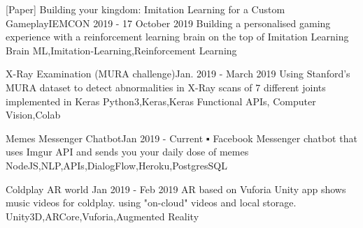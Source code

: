 

\begin{projects}
	
		\project
	{[Paper] Building your kingdom: Imitation Learning for a Custom Gameplay}{IEMCON 2019 - 17 October 2019}
	{\paperSymbol{ }
	}
	{Building a personalised gaming experience with a reinforcement learning brain on the top of Imitation Learning Brain}
	{ML,Imitation-Learning,Reinforcement Learning}

		\project
	{X-Ray Examination (MURA challenge)}{Jan. 2019 - March 2019}
	{}
	{Using Stanford's MURA dataset to detect abnormalities in X-Ray scans of 7 different joints
implemented in Keras}
	{Python3,Keras,Keras Functional APIs, Computer Vision,Colab}	
	
		\project
	{Memes Messenger Chatbot}{Jan 2019 - Current}
	{ }
	{▪	Facebook Messenger chatbot that uses Imgur API and sends you your daily dose of memes }
	{NodeJS,NLP,APIs,DialogFlow,Heroku,PostgresSQL}
	

		\project
	{Coldplay AR world }{Jan 2019 - Feb 2019}
	{ 
	}
	{AR based on Vuforia Unity app shows music videos for coldplay. using "on-cloud" videos and local storage.}
	{Unity3D,ARCore,Vuforia,Augmented Reality}
			
\end{projects}